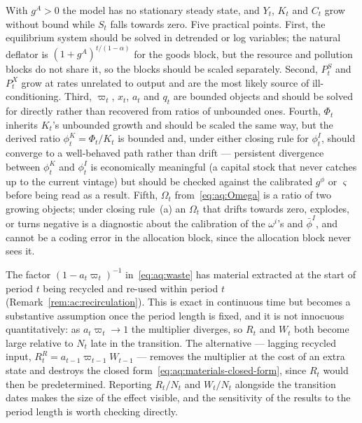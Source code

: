 \begin{remark}\label{rem:aq:scaling}
With $g^A>0$ the model has no stationary steady state, and $Y_t$, $K_t$ and $C_t$ grow without bound while $S_t$ falls towards zero. Five practical points. First, the equilibrium system should be solved in detrended or log variables; the natural deflator is $\left(1+g^A\right)^{t/(1-\alpha)}$ for the goods block, but the resource and pollution blocks do not share it, so the blocks should be scaled separately. Second, $P^S_t$ and $P^X_t$ grow at rates unrelated to output and are the most likely source of ill-conditioning. Third, $\varpi_t$, $x_t$, $a_t$ and $q_t$ are bounded objects and should be solved for directly rather than recovered from ratios of unbounded ones. Fourth, $\Phi_t$ inherits $K_t$'s unbounded growth and should be scaled the same way, but the derived ratio $\phi^K_t=\Phi_t/K_t$ is bounded and, under either closing rule for $\phi^I_t$, should converge to a well-behaved path rather than drift --- persistent divergence between $\phi^K_t$ and $\phi^I_t$ is economically meaningful (a capital stock that never catches up to the current vintage) but should be checked against the calibrated $g^\phi$ or $\varsigma$ before being read as a result. Fifth, $\Omega_t$ from~\eqref{eq:aq:Omega} is a ratio of two growing objects; under closing rule~(a) an $\Omega_t$ that drifts towards zero, explodes, or turns negative is a diagnostic about the calibration of the $\omega^i$'s and $\bar\phi^I$, and cannot be a coding error in the allocation block, since the allocation block never sees it.
\end{remark}

\begin{remark}\label{rem:aq:period}
The factor $\left(1-a_t\varpi_t\right)^{-1}$ in~\eqref{eq:aq:waste} has material extracted at the start of period $t$ being recycled and re-used within period $t$ (Remark~\ref{rem:ac:recirculation}). This is exact in continuous time but becomes a substantive assumption once the period length is fixed, and it is not innocuous quantitatively: as $a_t\varpi_t\to1$ the multiplier diverges, so $R_t$ and $W_t$ both become large relative to $N_t$ late in the transition. The alternative --- lagging recycled input, $R^R_t=a_{t-1}\varpi_{t-1}W_{t-1}$ --- removes the multiplier at the cost of an extra state and destroys the closed form~\eqref{eq:aq:materials-closed-form}, since $R_t$ would then be predetermined. Reporting $R_t/N_t$ and $W_t/N_t$ alongside the transition dates makes the size of the effect visible, and the sensitivity of the results to the period length is worth checking directly.
\end{remark}
